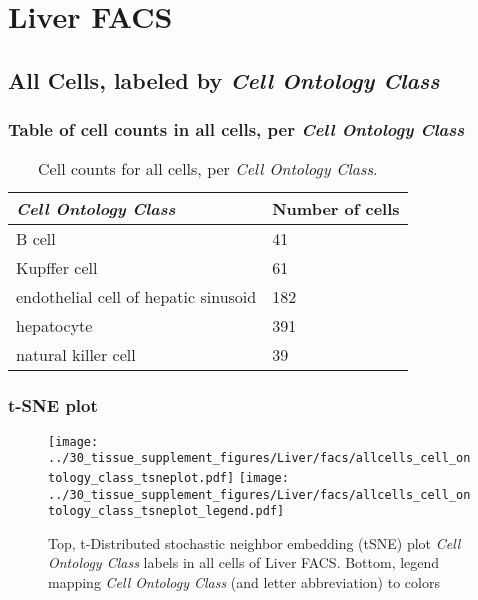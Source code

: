 \clearpage
\section{Liver FACS}

\subsection{All Cells, labeled by \emph{Cell Ontology Class}}
\subsubsection{Table of cell counts in all cells, per \emph{Cell Ontology Class}}\begin{table}[h]
\centering
\label{my-label}
\begin{tabular}{@{}ll@{}}
\toprule

\emph{Cell Ontology Class}& Number of cells \\ \midrule
B cell & 41 \\

Kupffer cell & 61 \\

endothelial cell of hepatic sinusoid & 182 \\

hepatocyte & 391 \\

natural killer cell & 39 \\
\bottomrule
\end{tabular}
\caption{Cell counts for all cells, per \emph{Cell Ontology Class}.}
\end{table}

\clearpage
\subsubsection{t-SNE plot}
\begin{figure}[h]
\centering
\texttt{[image: ../30\_tissue\_supplement\_figures/Liver/facs/allcells\_cell\_ontology\_class\_tsneplot.pdf]}
\texttt{[image: ../30\_tissue\_supplement\_figures/Liver/facs/allcells\_cell\_ontology\_class\_tsneplot\_legend.pdf]}
\caption{Top, t-Distributed stochastic neighbor embedding (tSNE) plot  \emph{Cell Ontology Class} labels in all cells of Liver FACS. Bottom, legend mapping \emph{Cell Ontology Class} (and letter abbreviation) to colors}
\end{figure}


\clearpage

